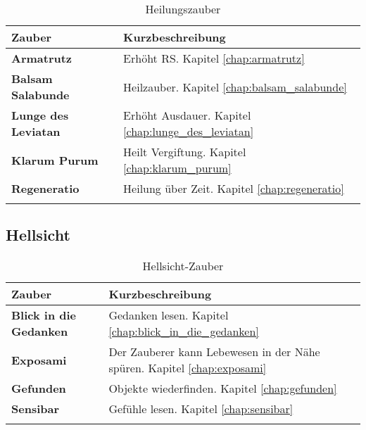 \begin{longtable}{|p{5cm}|p{10cm}|}
\hline
\textbf{Zauber} & \textbf{Kurzbeschreibung} \\ \hline

\textbf{Armatrutz} & Erhöht RS. Kapitel \ref{chap:armatrutz} \\ \hline

\textbf{Balsam Salabunde} & Heilzauber. Kapitel \ref{chap:balsam_salabunde} \\ \hline

\textbf{Lunge des Leviatan} & Erhöht Ausdauer. Kapitel \ref{chap:lunge_des_leviatan} \\ \hline

\textbf{Klarum Purum} & Heilt Vergiftung. Kapitel \ref{chap:klarum_purum} \\ \hline

\textbf{Regeneratio} & Heilung über Zeit. Kapitel \ref{chap:regeneratio} \\ \hline

\caption{Heilungszauber}
\label{tab:heilungszauber}
\end{longtable}


\subsection{Hellsicht}
\begin{longtable}{|p{5cm}|p{10cm}|}
\hline
\textbf{Zauber} & \textbf{Kurzbeschreibung} \\ \hline

\textbf{Blick in die Gedanken} & Gedanken lesen. Kapitel \ref{chap:blick_in_die_gedanken} \\ \hline

\textbf{Exposami} & Der Zauberer kann Lebewesen in der Nähe spüren. Kapitel \ref{chap:exposami} \\ \hline

\textbf{Gefunden} & Objekte wiederfinden. Kapitel \ref{chap:gefunden} \\ \hline

\textbf{Sensibar} & Gefühle lesen. Kapitel \ref{chap:sensibar} \\ \hline

\caption{Hellsicht-Zauber}
\label{tab:hellsicht-zauber}
\end{longtable}


